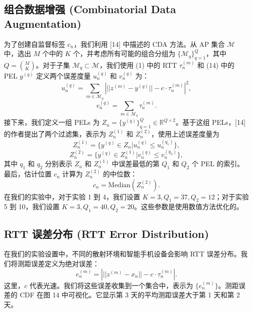 \documentclass[journal]{IEEEtran}
\begin{document}
\subsection{组合数据增强 (Combinatorial Data Augmentation)}
为了创建自监督标签 $c_n$，我们利用 [14] 中描述的 CDA 方法。从 AP 集合 $\mathcal{M}$ 中，选出 $M$ 个中的 $K$ 个，并考虑所有可能的组合分组为 $\{\mathcal{M}_q\}_{q=1}^Q$，其中 $Q=\binom{M}{K}$。对于子集 $\mathcal{M}_q \subset \mathcal{M}$，我们使用 (1) 中的 RTT $\tau_n^{(m)}$ 和 (14) 中的 PEL $y^{(q)}$ 定义两个误差度量 $u_n^{(q)}$ 和 $v_n^{(q)}$ 为：
\begin{equation}
u_n^{(q)} = \sum_{m\in\mathcal{M}_q} \left| ||z^{(m)} - y^{(q)}|| - c \cdot \tau_n^{(m)} \right|^2, \label{eq:29}
\end{equation}
\begin{equation}
v_n^{(q)} = \sum_{m\in\mathcal{M}_q} \tau_n^{(m)}. \label{eq:30}
\end{equation}
接下来，我们定义一组 PELs 为 $Z_n = \{y^{(q)}\}_{q=1}^Q \in \mathbb{R}^{Q\times2}$。基于这组 PELs，[14] 的作者提出了两个过滤集，表示为 $Z_n^{(1)}$ 和 $Z_n^{(2)}$，使用上述误差度量为
\begin{equation}
Z_n^{(1)} = \{y^{(q)} \in Z_n | u_n^{(q)} \le u_n^{(q_1)} \}, 
\end{equation}
\begin{equation}
Z_n^{(2)} = \{y^{(q)} \in Z_n^{(1)} | v_n^{(q)} \le v_n^{(q_2)} \}, \label{eq:30_2}
\end{equation}
其中 $q_1$ 和 $q_2$ 分别表示 $Z_n$ 和 $Z_n^{(1)}$ 中误差最低的第 $Q_1$ 和 $Q_2$ 个 PEL 的索引。最后，估计位置 $c_n$ 计算为 $Z_n^{(2)}$ 的中位数：
\begin{equation}
c_n = \text{Median}(Z_n^{(2)}). \label{eq:31}
\end{equation}
在我们的实验中，对于实验 1 到 4，我们设置 $K=3, Q_1=37, Q_2=12$；对于实验 5 到 10，我们设置 $K=3, Q_1=40, Q_2=20$。这些参数是使用数值方法优化的。

\subsection{RTT 误差分布 (RTT Error Distribution)}
在我们的实验设置中，不同的散射环境和智能手机设备会影响 RTT 误差分布。我们将测距误差定义为绝对误差：
\begin{equation}
e_n^{(m)} = \left| ||z^{(m)} - x_n|| - c \cdot \tau_n^{(m)} \right|. \label{eq:32}
\end{equation}
这里，$c$ 代表光速。我们将这些误差收集到一个集合中，表示为 $\{e_n^{(m)}\}$。测距误差的 CDF 在图 14 中可视化。它显示第 3 天的平均测距误差大于第 1 天和第 2 天。
\end{document}
